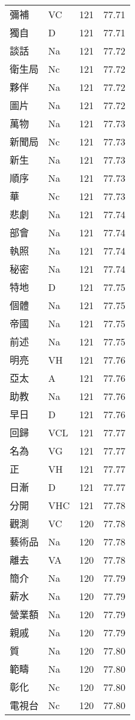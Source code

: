 \documentclass[twocolumn]{book}
\begin{document}
\begin{supertabular}{llrr}
彌補 & VC & 121 &  77.71\\
獨自 & D & 121 &  77.71\\
談話 & Na & 121 &  77.72\\
衛生局 & Nc & 121 &  77.72\\
夥伴 & Na & 121 &  77.72\\
圖片 & Na & 121 &  77.72\\
萬物 & Na & 121 &  77.73\\
新聞局 & Nc & 121 &  77.73\\
新生 & Na & 121 &  77.73\\
順序 & Na & 121 &  77.73\\
華 & Nc & 121 &  77.73\\
悲劇 & Na & 121 &  77.74\\
部會 & Na & 121 &  77.74\\
執照 & Na & 121 &  77.74\\
秘密 & Na & 121 &  77.74\\
特地 & D & 121 &  77.75\\
個體 & Na & 121 &  77.75\\
帝國 & Na & 121 &  77.75\\
前述 & Na & 121 &  77.75\\
明亮 & VH & 121 &  77.76\\
亞太 & A & 121 &  77.76\\
助教 & Na & 121 &  77.76\\
早日 & D & 121 &  77.76\\
回歸 & VCL & 121 &  77.77\\
名為 & VG & 121 &  77.77\\
正 & VH & 121 &  77.77\\
日漸 & D & 121 &  77.77\\
分開 & VHC & 121 &  77.78\\
觀測 & VC & 120 &  77.78\\
藝術品 & Na & 120 &  77.78\\
離去 & VA & 120 &  77.78\\
簡介 & Na & 120 &  77.79\\
薪水 & Na & 120 &  77.79\\
營業額 & Na & 120 &  77.79\\
親戚 & Na & 120 &  77.79\\
質 & Na & 120 &  77.80\\
範疇 & Na & 120 &  77.80\\
彰化 & Nc & 120 &  77.80\\
電視台 & Nc & 120 &  77.80\\

\end{supertabular}
\end{document}
